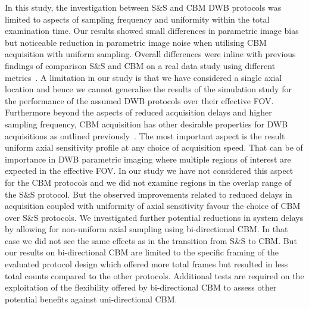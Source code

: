 In this study, the investigation between S\&S and CBM DWB protocols was limited to aspects of sampling frequency and uniformity within the total examination time. 
Our results showed small differences in parametric image bias but noticeable reduction in parametric image noise when utilising CBM acquisition with uniform sampling. 
Overall differences were inline with previous findings of comparison S\&S and CBM on a real data study using different metrics~\cite{Karakatsanis2016b}. 
A limitation in our study is that we have considered a single axial location and hence we cannot generalise the results of the simulation study for the performance of the assumed DWB protocols over their effective FOV. 
Furthermore beyond the aspects of reduced acquisition delays and higher sampling frequency, CBM acquisition has other desirable properties for DWB acquisitions as outlined previously~\cite{Karakatsanis2016b}. 
The most important aspect is the result uniform axial sensitivity profile at any choice of acquisition speed. 
That can be of importance in DWB parametric imaging where multiple regions of interest are expected in the effective FOV.
In our study we have not considered this aspect for the CBM protocols and we did not examine regions in the overlap range of the S\&S protocol. 
But the observed improvements related to reduced delays in acquisition coupled with uniformity of axial sensitivity favour the choice of CBM over S\&S protocols. 
We investigated further potential reductions in system delays by allowing for non-uniform axial sampling using bi-directional CBM.
In that case we did not see the same effects as in the transition from S\&S to CBM. %
But our results on bi-directional CBM are limited to the specific framing of the evaluated protocol design which offered more total frames but resulted in less total counts compared to the other protocols. Additional tests are required on the exploitation of the flexibility offered by bi-directional CBM to assess other potential benefits against uni-directional CBM.

